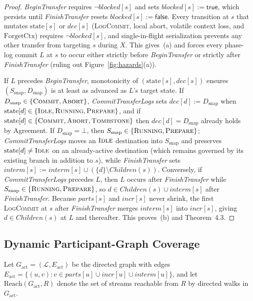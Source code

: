 \documentclass[sigconf,nonacm]{acmart}
\newcommand{\stIdle}{\textsc{Idle}}
\newcommand{\stRun}{\textsc{Running}}
\newcommand{\stPrep}{\textsc{Prepare}}
\newcommand{\stCom}{\textsc{Commit}}
\newcommand{\stAbt}{\textsc{Abort}}
\newcommand{\stTomb}{\textsc{Tombstone}}
\newcommand{\Children}{\mathit{Children}}
\newcommand{\parts}{\mathit{parts}}
\newcommand{\incr}{\mathit{incr}}
\newcommand{\interm}{\mathit{interm}}
\newcommand{\dec}{\mathit{dec}}
\newcommand{\blocked}{\mathit{blocked}}
\begin{document}
\begin{proof}
\emph{BeginTransfer} requires \(\neg\blocked[s]\) and sets \(\blocked[s] :=
\mathsf{true}\), which persists until \emph{FinishTransfer} resets
\(\blocked[s] := \mathsf{false}\). Every transition at \(s\) that mutates
\(\mathrm{state}[s]\) or \(\dec[s]\) (\textsc{LogCommit}, local abort,
volatile context loss, and \(\mathrm{ForgetCtx}\)) requires
\(\neg\blocked[s]\), and single-in-flight serialization prevents any other
transfer from targeting \(s\) during \(X\). This gives~(a) and forces every
phase-log commit \(L\) at \(s\) to occur either strictly before
\emph{BeginTransfer} or strictly after \emph{FinishTransfer} (ruling out
Figure~\ref{fig:hazards}(a)).

If \(L\) precedes \emph{BeginTransfer}, monotonicity of
\((\mathrm{state}[s], \dec[s])\) ensures \((S_{\mathrm{snap}},
D_{\mathrm{snap}})\) is at least as advanced as \(L\)'s target state. If
\(D_{\mathrm{snap}} \in \{\stCom,\allowbreak \stAbt\}\),
\emph{CommitTransferLogs} sets \(\dec[d] := D_{\mathrm{snap}}\) when
\(\mathrm{state}[d] \in \{\stIdle,\allowbreak \stRun,\allowbreak \stPrep\}\),
and if \(\mathrm{state}[d] \in \{\stCom,\allowbreak \stAbt,\allowbreak
\stTomb\}\) then \(\dec[d] = D_{\mathrm{snap}}\) already holds by Agreement.
If \(D_{\mathrm{snap}} = \bot\), then \(S_{\mathrm{snap}} \in
\{\stRun,\allowbreak \stPrep\}\); \emph{CommitTransferLogs} moves an
\(\stIdle\) destination into \(S_{\mathrm{snap}}\) and preserves
\(\mathrm{state}[d] \neq \stIdle\) on an already-active destination (which
remains governed by its existing branch in addition to \(s\)), while
\emph{FinishTransfer} sets \(\interm[s] := \interm[s] \cup (\{d\} \setminus
\Children(s))\). Conversely, if \emph{CommitTransferLogs} precedes \(L\),
then \(L\) occurs after \emph{FinishTransfer} while \(S_{\mathrm{snap}} \in
\{\stRun,\allowbreak \stPrep\}\), so \(d \in \Children(s) \cup \interm[s]\)
after \emph{FinishTransfer}. Because \(\parts[s]\) and \(\incr[s]\) never
shrink, the first \textsc{LogCommit} at \(s\) after \emph{FinishTransfer}
merges \(\interm[s]\) into \(\incr[s]\), giving \(d \in \Children(s)\) at
\(L\) and thereafter. This proves~(b) and Theorem~4.3.
\end{proof}

\subsection{Dynamic Participant-Graph Coverage}
\label{sec:coverage}
Let \(G_{\mathrm{act}} = (\mathcal{L}, E_{\mathrm{act}})\) be the directed
graph with edges \(E_{\mathrm{act}} = \{(u, v) : v \in \parts[u] \cup
\incr[u] \cup \interm[u]\}\), and let \(\mathrm{Reach}(G_{\mathrm{act}},
R)\) denote the set of streams reachable from \(R\) by directed walks in
\(G_{\mathrm{act}}\).
\end{document}
